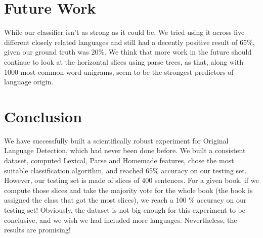 \documentclass[10pt]{article}
\begin{document}
\section{Future Work}
While our classifier isn't as strong as it could be, We tried using it across five different closely related languages and still had a decently positive result of 65\%, given our ground truth was 20\%. We think that more work in the future should continue to look at the horizontal slices using parse trees, as that, along with 1000 most common word unigrams, seem to be the strongest predictors of language origin.

\section{Conclusion}
We have successfully built a scientifically robust experiment for Original Language Detection, which had never been done before. We built a consistent dataset, computed Lexical, Parse and Homemade features, chose the most suitable classification algorithm, and reached 65\% accuracy on our testing set. However, our testing set is made of slices of 400 sentences. For a given book, if we compute those slices and take the majority vote for the whole book (the book is assigned the class that got the most slices), we reach a 100 \% accuracy on our testing set! Obviously, the dataset is not big enough for this experiment to be conclusive, and we wish we had included more languages. Nevertheless, the results are promising!



\end{document}
